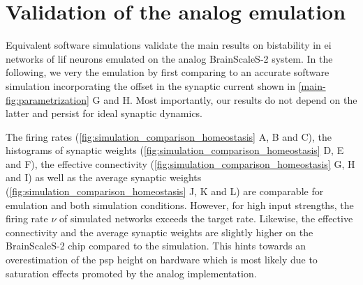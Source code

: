 \begin{figure*}[t]
{
}
	\caption{%
		\textbf{Software simulations validate the neuromorphic emulation on BrainScaleS-2.}
		The panels \textbf{(A)}, \textbf{(D)}, \textbf{(G)} and \textbf{(J)} show the emulation results already presented in \cref{main-fig:chip} in the main part of this manuscript.
		The panels \textbf{(B)}, \textbf{(E)}, \textbf{(H)} and \textbf{(K)} illustrate the results of corresponding software simulations incorporating the amplitude offset within the synaptic currents present on the neuromorphic system, whereas \textbf{(C)}, \textbf{(F)}, \textbf{(I)} and \textbf{(L)} depict the simulation data acquired for ideal dynamics and hence without offset.
	}
	\label{fig:simulation_comparison_homeostasis}
\end{figure*}

\section{Validation of the analog emulation \label{sec:validation}}

Equivalent software simulations validate the main results on bistability in \gls{ei} networks of \gls{lif} neurons emulated on the analog BrainScaleS-2 system.
In the following, we very the emulation by first comparing to an accurate software simulation incorporating the offset in the synaptic current shown in \cref{main-fig:parametrization} G and H.
Most importantly, our results do not depend on the latter and persist for ideal synaptic dynamics.

The firing rates (\cref{fig:simulation_comparison_homeostasis} A, B and C), the histograms of synaptic weights (\cref{fig:simulation_comparison_homeostasis} D, E and F), the effective connectivity (\cref{fig:simulation_comparison_homeostasis} G, H and I) as well as the average synaptic weights (\cref{fig:simulation_comparison_homeostasis} J, K and L) are comparable for emulation and both simulation conditions.
However, for high input strengths, the firing rate $\nu$ of simulated networks exceeds the target rate.
Likewise, the effective connectivity and the average synaptic weights are slightly higher on the BrainScaleS-2 chip compared to the simulation.
This hints towards an overestimation of the \gls{psp} height on hardware which is most likely due to saturation effects promoted by the analog implementation.

